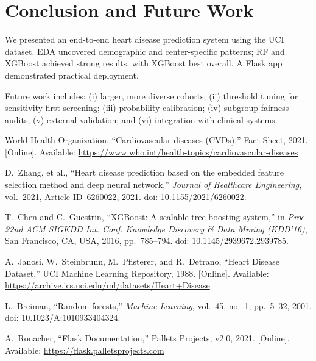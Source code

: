 \documentclass[conference]{IEEEtran}
\begin{document}
\section{Conclusion and Future Work}
We presented an end-to-end heart disease prediction system using the UCI dataset. EDA uncovered demographic and center-specific patterns; RF and XGBoost achieved strong results, with XGBoost best overall. A Flask app demonstrated practical deployment.

Future work includes: (i) larger, more diverse cohorts; (ii) threshold tuning for sensitivity-first screening; (iii) probability calibration; (iv) subgroup fairness audits; (v) external validation; and (vi) integration with clinical systems.

\begin{thebibliography}{00}

World Health Organization, ``Cardiovascular diseases (CVDs),'' Fact Sheet, 2021. [Online]. Available: \url{https://www.who.int/health-topics/cardiovascular-diseases}

D.~Zhang, et al., ``Heart disease prediction based on the embedded feature selection method and deep neural network,'' \emph{Journal of Healthcare Engineering}, vol.~2021, Article ID~6260022, 2021. doi: 10.1155/2021/6260022.

T.~Chen and C.~Guestrin, ``XGBoost: A scalable tree boosting system,'' in \emph{Proc. 22nd ACM SIGKDD Int. Conf. Knowledge Discovery \& Data Mining (KDD'16)}, San Francisco, CA, USA, 2016, pp.~785--794. doi: 10.1145/2939672.2939785.

A.~Janosi, W.~Steinbrunn, M.~Pfisterer, and R.~Detrano, ``Heart Disease Dataset,'' UCI Machine Learning Repository, 1988. [Online]. Available: \url{https://archive.ics.uci.edu/ml/datasets/Heart+Disease}

L.~Breiman, ``Random forests,'' \emph{Machine Learning}, vol.~45, no.~1, pp.~5--32, 2001. doi: 10.1023/A:1010933404324.

A.~Ronacher, ``Flask Documentation,'' Pallets Projects, v2.0, 2021. [Online]. Available: \url{https://flask.palletsprojects.com}

\end{thebibliography}
\pagebreak

\appendices
\end{document}
